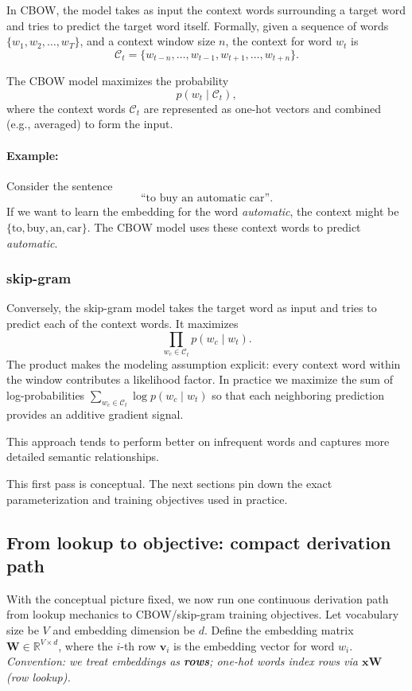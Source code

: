 In CBOW, the model takes as input the context words surrounding a target word and tries to predict the target word itself. Formally, given a sequence of words \(\{w_1, w_2, \ldots, w_T\}\), and a context window size \(n\), the context for word \(w_t\) is
\[
\mathcal{C}_t = \{w_{t-n}, \ldots, w_{t-1}, w_{t+1}, \ldots, w_{t+n}\}.
\]

The CBOW model maximizes the probability
\[
p(w_t \mid \mathcal{C}_t),
\]
where the context words \(\mathcal{C}_t\) are represented as one-hot vectors and combined (e.g., averaged) to form the input.

\paragraph{Example:} Consider the sentence
\[
\text{``to buy an automatic car''}.
\]
If we want to learn the embedding for the word \emph{automatic}, the context might be \(\{\text{to}, \text{buy}, \text{an}, \text{car}\}\). The CBOW model uses these context words to predict \emph{automatic}.

\subsubsection{skip-gram}
\label{sec:nlp_skip_gram_sub}

Conversely, the skip-gram model takes the target word as input and tries to predict each of the context words. It maximizes
\[
\prod_{w_c \in \mathcal{C}_t} p(w_c \mid w_t).
\]
The product makes the modeling assumption explicit: every context word within the window contributes a likelihood factor.
In practice we maximize the sum of log-probabilities
\(\sum_{w_c \in \mathcal{C}_t} \log p(w_c \mid w_t)\) so that each neighboring prediction provides an additive gradient signal.

This approach tends to perform better on infrequent words and captures more detailed semantic relationships.

This first pass is conceptual. The next sections pin down the exact parameterization and training objectives used in practice.

\subsection{From lookup to objective: compact derivation path}
\label{sec:nlp_mathematical_formulation_of_cbow}

With the conceptual picture fixed, we now run one continuous derivation path from lookup mechanics to CBOW/skip-gram training objectives. Let vocabulary size be \(V\) and embedding dimension be \(d\). Define the embedding matrix \(\mathbf{W} \in \mathbb{R}^{V \times d}\), where the \(i\)-th row \(\mathbf{v}_i\) is the embedding vector for word \(w_i\). \emph{Convention: we treat embeddings as \textbf{rows}; one-hot words index rows via $\mathbf{x}\mathbf{W}$ (row lookup).}

